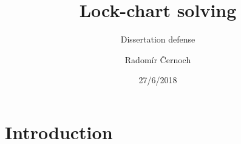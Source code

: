 

\usepackage{colortbl}
\usepackage{xltxtra}
\usepackage{nameref}
\usepackage{tikz, pgf, pgfplots}
\usepackage{gnuplot-lua-tikz}
\makeatletter
\newcommand*{\sectionframe}{\frame{\huge{\textbf{\thesection}. \@currentlabelname}}}
\makeatother
\usepackage[authoryear]{natbib}
\usepackage{rotating}

\title{Lock-chart solving}
\subtitle{Dissertation defense}

\author{Radomír Černoch}
\date{27/6/2018}

\newcommand\cinv{\cellcolor{black}\color{white}}
\newcommand\bigforall{\mbox{\Large $\mathsurround0pt\forall$}}




\begin{frame}
  \titlepage
\end{frame}



\section{Introduction}
\sectionframe



